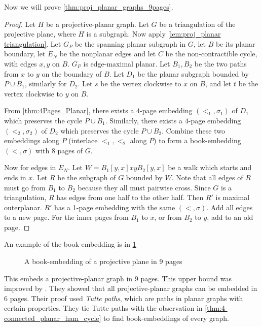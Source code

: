 Now we will prove \cref{thm:proj_planar_graphs_9pages}.
\begin{proof}
    Let $H$ be a projective-planar graph. Let $G$ be a triangulation of the projective plane, where $H$ is a subgraph.
    Now apply \cref{lem:proj_planar triangulation}. Let $G_P$ be the spanning planar subgraph in $G$, let $B$ be its planar boundary, let $E_N$ be the nonplanar edges and let $C$ be the non-contractible cycle, with edges $x, y$ on $B$. $G_P$ is edge-maximal planar. Let $B_1, B_2$ be the two paths from $x$ to $y$ on the boundary of $B$. Let $D_1$ be the planar subgraph bounded by $P \cup B_1$, similarly for $D_2$. Let $s$ be the vertex clockwise to $x$ on $B$, and let $t$ be the vertex clockwise to $y$ on $B$.

    From \cref{thm:4Pages_Planar}, there exists a $4$-page embedding $(<_1, \sigma_1)$ of $D_1$ which preserves the cycle $P \cup B_1$. Similarly, there exists a $4$-page embedding $(<_2, \sigma_2)$ of $D_2$ which preserves the cycle $P \cup B_2$. Combine these two embeddings along $P$ (interlace $<_1, <_2$ along $P$) to form a book-embedding $(<, \sigma)$ with $8$ pages of $G$. 

    Now for edges in $E_N$. Let $W = B_1[y, x] xy B_2[y, x]$ be a walk which starts and ends in $x$. Let $R$ be the subgraph of $G$ bounded by $W$. Note that all edges of $R$ must go from $B_1$ to $B_2$ because they all must pairwise cross. Since $G$ is a triangulation, $R$ has edges from one half to the other half. Then $R'$ is maximal outerplanar. $R'$ has a 1-page embedding with the same $(<, \sigma)$. Add all edges to a new page. For the inner pages from $B_1$ to $x$, or from $B_2$ to $y$, add to an old page. 
\end{proof}

An example of the book-embedding is in \cref{fig:projectiveplanarbookembedding}

\begin{figure}[h]
    \centering
    
    \caption[Projective-Planar book-embedding]{A book-embedding of a projective plane in 9 pages}\label{fig:projectiveplanarbookembedding}
\end{figure}

This embeds a projective-planar graph in 9 pages. This upper bound was improved by \textcite{ozekiBookEmbeddingGraphs2019}. They showed that all projective-planar graphs can be embedded in 6 pages. Their proof used \textit{Tutte paths}, which are paths in planar graphs with certain properties. They tie Tutte paths with the observation in \cref{thm:4-connected_planar_ham_cycle} to find book-embeddings of every graph. 

